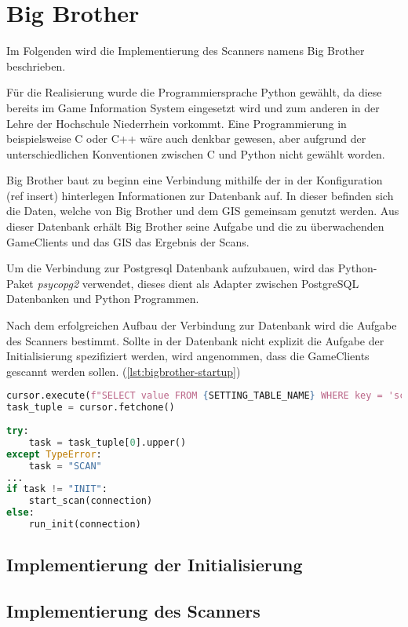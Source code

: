 \section{Big Brother}

Im Folgenden wird die Implementierung des Scanners namens Big Brother beschrieben.

Für die Realisierung wurde die Programmiersprache Python gewählt, da diese bereits im Game Information System eingesetzt wird und zum anderen in der Lehre der Hochschule Niederrhein vorkommt. Eine Programmierung in beispielsweise C oder C++ wäre auch denkbar gewesen, aber aufgrund der unterschiedlichen Konventionen zwischen C und Python nicht gewählt worden.

Big Brother baut zu beginn eine Verbindung mithilfe der in der Konfiguration (ref insert) hinterlegen Informationen zur Datenbank auf. In dieser befinden sich die Daten, welche von Big Brother und dem GIS gemeinsam genutzt werden. Aus dieser Datenbank erhält Big Brother seine Aufgabe und die zu überwachenden GameClients und das GIS das Ergebnis der Scans.

Um die Verbindung zur Postgresql Datenbank aufzubauen, wird das Python-Paket \textit{psycopg2} verwendet, dieses dient als Adapter zwischen PostgreSQL Datenbanken und Python Programmen. 

Nach dem erfolgreichen Aufbau der Verbindung zur Datenbank wird die Aufgabe des Scanners bestimmt. Sollte in der Datenbank nicht explizit die Aufgabe der Initialisierung spezifiziert werden, wird angenommen, dass die GameClients gescannt werden sollen. (\ref{lst:bigbrother-startup})

\begin{lstlisting}[language=Python, frame=single, caption={todo}, captionpos=b, label={lst:bigbrother-startup}]
cursor.execute(f"SELECT value FROM {SETTING_TABLE_NAME} WHERE key = 'scanner.task'")
task_tuple = cursor.fetchone()
	
try:
	task = task_tuple[0].upper()
except TypeError:
	task = "SCAN"
...
if task != "INIT":
	start_scan(connection)
else:
	run_init(connection)	
\end{lstlisting}


\subsection{Implementierung der Initialisierung}

\subsection{Implementierung des Scanners}

